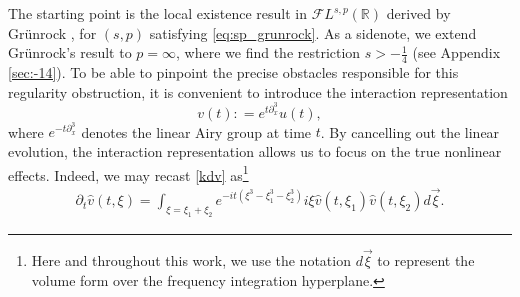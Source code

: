 \documentclass[%
11pt,  reqno]{amsart}
\newcommand{\5}{\textup{V}}
\DeclareMathOperator*{\intt}{\int}
\newcommand{\dx}{\partial_x}
\newcommand{\dt}{\partial_t}
\newtheorem{proposition}[theorem]{Proposition}
\theoremstyle{remark}
\newcommand{\R}{\mathbb{R}}
\numberwithin{equation}{section}
\numberwithin{theorem}{section}
\begin{document}
	The starting point is the local existence result in $\mathcal{F}L^{s,p}(\R)$ derived by Grünrock \cite{Grunrock_ldv_hier}, for $(s,p)$ satisfying \eqref{eq:sp_grunrock}. As a sidenote, we extend Grünrock's result to $p=\infty$, where we find the restriction $s>-\frac14$ (see Appendix \ref{sec:-14}).
	To be able to pinpoint the precise obstacles responsible for this regularity obstruction,  it is convenient to introduce the interaction representation \cite{Ginibre_interaction_rep}
	\begin{equation}\label{inter}
		v(t) : = e^{t\partial_x^3}u(t),
	\end{equation} 
	where $e^{-t\dx^3}$ denotes the linear Airy group at time $t$. By cancelling out the linear evolution, the interaction representation allows us to focus on the true nonlinear effects. Indeed, we may recast \eqref{kdv} as\footnote{Here and throughout this work, we use the notation $d\vec{\xi}$ to represent the volume form over the frequency integration hyperplane.}
	\begin{align}
		\label{dtv}
		\dt{\widehat{v}}(t,\xi) = \intt_{\xi = \xi_1+\xi_2} e^{-it (\xi^3 -\xi_1^3 -
			\xi^3_2)} i \xi \widehat{v}(t,\xi_1) \widehat{v}(t,\xi_2)  d\vec{\xi}
		.
	\end{align}
\end{document}
